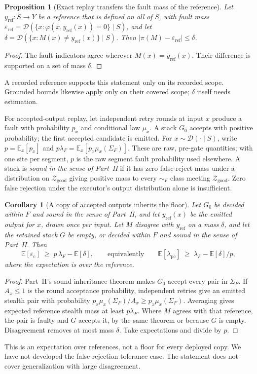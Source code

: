 \documentclass[11pt]{article}
\newtheorem{corollary}{Corollary}
\newtheorem{proposition}{Proposition}
\theoremstyle{definition}
\theoremstyle{remark}
\newcommand{\simF}{\sim_F}
\newcommand{\SigF}{\Sigma_F}
\newcommand{\lF}{\lambda_F}
\newcommand{\lpc}{\lambda_{\mathrm{pc}}}
\newcommand{\ecl}{\varepsilon_{\mathrm{c}}}
\newcommand{\D}{\mathcal{D}}
\newcommand{\Zgood}{\mathcal{Z}_{\mathrm{good}}}
\begin{document}
\begin{proposition}[Exact replay transfers the fault mass of the reference]\label{prop:replay}
Let $y_{\mathrm{ref}}:S\to Y$ be a reference that is defined on all of $S$, with fault mass
$\varepsilon_{\mathrm{ref}}=\D(\{x:\varphi(x,y_{\mathrm{ref}}(x))=0\}\mid S)$, and let
$\delta=\D(\{x: M(x)\neq y_{\mathrm{ref}}(x)\}\mid S)$. Then
$\lvert\pi(M)-\varepsilon_{\mathrm{ref}}\rvert\le\delta$.
\end{proposition}
\begin{proof}
The fault indicators agree wherever $M(x)=y_{\mathrm{ref}}(x)$.
Their difference is supported on a set of mass $\delta$.
\end{proof}
A recorded reference supports this statement only on its recorded scope.
Grounded bounds likewise apply only on their covered scope; $\delta$ itself needs estimation.

For accepted-output replay, let independent retry rounds at input $x$ produce a fault with
probability $p_x$ and conditional law $\mu_x$.
A stack $G_0$ accepts with positive probability; the first accepted candidate is emitted.
For $x\sim\D(\cdot\mid S)$, write
$p=\mathbb{E}_x[p_x]$ and $p\lF=\mathbb{E}_x[p_x\mu_x(\SigF)]$.
These are raw, pre-gate quantities; with one site per segment, $p$ is the raw segment fault
probability used elsewhere.
A stack is \emph{sound in the sense of Part~II} if it has zero false-reject mass under a
distribution on $\Zgood$ giving positive mass to every $\simF$ class meeting $\Zgood$.
Zero false rejection under the executor's output distribution alone is insufficient.

\begin{corollary}[A copy of accepted outputs inherits the floor]\label{cor:replayfloor}
Let $G_0$ be decided within $F$ and sound in the sense of Part~II, and let $y_{\mathrm{ref}}(x)$ be
the emitted output for $x$, drawn once per input. Let $M$ disagree with $y_{\mathrm{ref}}$ on a mass
$\delta$, and let the retained stack $G$ be empty, or decided within $F$ and sound in the sense of
Part~II. Then
\[
\mathbb{E}[\ecl]\;\ge\;p\,\lF-\mathbb{E}[\delta],
\qquad\text{equivalently}\qquad
\mathbb{E}[\lpc]\;\ge\;\lF-\mathbb{E}[\delta]/p ,
\]
where the expectation is over the reference.
\end{corollary}
\begin{proof}
Part~II's sound inheritance theorem makes $G_0$ accept every pair in $\SigF$.
If $A_x\le1$ is the round acceptance probability, independent retries give an emitted stealth
pair with probability $p_x\mu_x(\SigF)/A_x\ge p_x\mu_x(\SigF)$.
Averaging gives expected reference stealth mass at least $p\lF$.
Where $M$ agrees with that reference, the pair is faulty and $G$ accepts it, by the same theorem
or because $G$ is empty. Disagreement removes at most mass $\delta$.
Take expectations and divide by $p$.
\end{proof}
This is an expectation over references, not a floor for every deployed copy.
We have not developed the false-rejection tolerance case.
The statement does not cover generalization with large disagreement.
\end{document}
